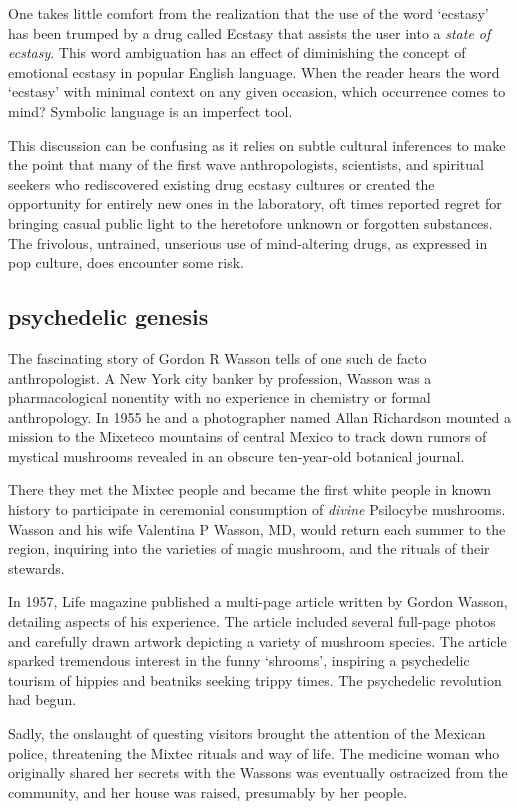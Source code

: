 \documentclass{UIdahoMastersThesis}
\begin{document}
One takes little comfort from the realization that the use of the word `ecstasy' has been trumped by a drug called Ecstasy that assists the user into a \emph{state of ecstasy}. This word ambiguation has an effect of diminishing the concept of emotional ecstasy in popular English language. When the reader hears the word `ecstasy' with minimal context on any given occasion, which occurrence comes to mind? Symbolic language is an imperfect tool.
 
This discussion can be confusing as it relies on subtle cultural inferences to make the point that many of the first wave anthropologists, scientists, and spiritual seekers who rediscovered existing drug ecstasy cultures or created the opportunity for entirely new ones in the laboratory, oft times reported regret for bringing casual public light to the heretofore unknown or forgotten substances. The frivolous, untrained, unserious use of mind-altering drugs, as expressed in pop culture, does encounter some risk. 


\subsection{psychedelic genesis}

The fascinating story of Gordon R Wasson tells of one such de facto anthropologist. A New York city banker by profession, Wasson was a pharmacological nonentity with no experience in chemistry or formal anthropology. In 1955 he and a photographer named Allan Richardson mounted a mission to the Mixeteco mountains of central Mexico to track down rumors of mystical mushrooms revealed in an obscure ten-year-old botanical journal.

There they met the Mixtec people and became the first white people in known history to participate in ceremonial consumption of \emph{divine} Psilocybe mushrooms. Wasson and his wife Valentina P Wasson, MD, would return each summer to the region, inquiring into the varieties of magic mushroom, and the rituals of their stewards.

In 1957, Life magazine published a multi-page article written by Gordon Wasson, detailing aspects of his experience. The article included several full-page photos and carefully drawn artwork depicting a variety of mushroom species. The article sparked tremendous interest in the funny `shrooms', inspiring a psychedelic tourism of hippies and beatniks seeking trippy times. The psychedelic revolution had begun. 

Sadly, the onslaught of questing visitors brought the attention of the Mexican police, threatening the Mixtec rituals and way of life. The medicine woman who originally shared her secrets with the Wassons was eventually ostracized from the community, and her house was raised, presumably by her people.
\end{document}
